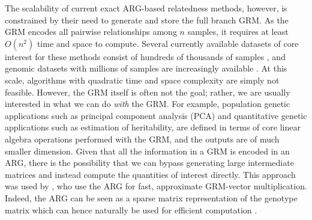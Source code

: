 
The scalability of current exact ARG-based relatedness methods, however, is constrained by
their need to generate and store the full branch GRM. As the GRM encodes all 
pairwise relationships among $n$ samples, it requires at least $O(n^2)$
time and space to compute. 
Several currently available datasets of core interest for these  methods 
consist of hundreds of thousands of 
samples \citep{caulfield2017national,turnbull2018100,
bycroft2018genome,backman2021exome,RosFreixedes2022pig,
halldorsson2022sequences,uk2023whole,all2024genomic},
and genomic datasets with millions of samples are increasingly available
\citep[e.g.][]{Cesarani2022, stark2024call, cook2025our, Cole2025Invited}.
At this scale, algorithms with quadratic time and space complexity are simply not feasible.
However, the GRM itself is often not the goal;
rather, we are usually interested in what we can do \emph{with} the GRM.
For example, population genetic applications such as principal component analysis (PCA)
and quantitative genetic applications such as estimation of heritability, are
defined in terms of core linear algebra operations performed with the GRM,
and the outputs are of much smaller dimension.
Given that all the information
in a GRM is encoded in an ARG, there is the possibility that we can bypass
generating large intermediate matrices and instead compute the quantities
of interest directly.
This approach was used by \citet{zhu2024variance}, who use the ARG
for fast, approximate GRM-vector multiplication.
Indeed, the ARG can be seen as a sparse matrix representation of the genotype matrix
which can hence naturally be used for efficient computation \citep{ralph2020efficiently}.



